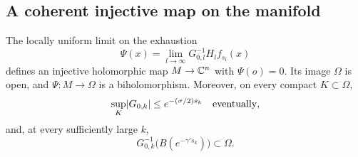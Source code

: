 \subsection{A coherent injective map on the manifold}

\begin{proposition}\label{prop:global-coordinates}
The locally uniform limit on the exhaustion
\begin{equation}
 \Psi(x)=\lim_{l\to\infty}G_{0,l}^{-1}H_lf_{s_l}(x)
 \label{eq:unif:global-map}
\end{equation}
defines an injective holomorphic map $M\to\mathbb C^n$ with $\Psi(o)=0$.
Its image $\Omega$ is open, and $\Psi:M\to\Omega$ is a
biholomorphism.  Moreover, on every compact $K\subset\Omega$,
\begin{equation}
 \sup_K\lvert G_{0,k}\rvert\le e^{-(\sigma/2)s_k}
 \quad\hbox{eventually},
 \label{eq:unif:forward-smallness}
\end{equation}
and, at every sufficiently large $k$,
\begin{equation}
 G_{0,k}^{-1}\bigl(B(e^{-\gamma's_k})\bigr)\subset\Omega.
 \label{eq:unif:inverse-ball-inclusion}
\end{equation}
\end{proposition}

